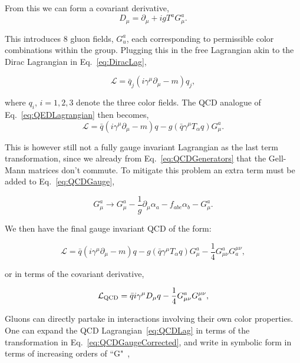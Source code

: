 From this we can form a covariant derivative, 
\begin{equation}
    \label{eq:CovariantDerivativeQCD}
    D_\mu = \partial_\mu + igT^{a}G^{a}_\mu.
\end{equation}

This introduces 8 gluon fields, $G^{a}_{u}$, each corresponding to permissible color combinations within the group. Plugging this in the free Lagrangian akin to the Dirac Lagrangian in Eq.~\ref{eq:DiracLag},

\begin{equation}
    \label{eq:FreeLag}
    \mathcal{L} = \bar{q}_{j}(i\gamma^{\mu} \partial_{\mu} - m)q_j, 
\end{equation}

where $q_i$, $i = 1,2,3$ denote the three color fields. The QCD analogue of Eq.~\ref{eq:QEDLagrangian} then becomes, 
\begin{equation}
    \label{eq:FreeLag}
  \mathcal{L} = \bar{q}(i\gamma^{\mu} \partial_{\mu} - m)q - g(\bar{q}\gamma^{\mu}T_{\alpha}q)G^{a}_{\mu}. 
\end{equation}

This is however still not a fully gauge invariant Lagrangian as the last term transformation, since we already from Eq.~\ref{eq:QCDGenerators} that the Gell-Mann matrices don't commute. To mitigate this problem an extra term must be added to Eq.~\ref{eq:QCDGauge}, 

\begin{equation}
    \label{eq:QCDGaugeCorrected}
    G^{a}_{\mu} \rightarrow G^{a}_{\mu} - \frac{1}{g}\partial_{\mu} \alpha_a -f_{abc}\alpha_{b}-G^{a}_{\mu}.
\end{equation}

We then have the final gauge invariant QCD of the form:

\begin{equation}
    \label{eq:QCDLag}
  \mathcal{L} = \bar{q}(i\gamma^{\mu} \partial_{\mu} - m)q - g(\bar{q}\gamma^{\mu}T_{\alpha}q)G^{a}_{\mu} - \frac{1}{4}G^{a}_{\mu\nu}G^{\mu\nu}_{a},
\end{equation}

or in terms of the covariant derivative, 

\begin{equation}
    \label{eq:QCDLag}
  \mathcal{L}_{\textnormal{QCD}} = \bar{q}i\gamma^{\mu} D_{\mu}q - \frac{1}{4}G^{a}_{\mu\nu}G^{\mu\nu}_{a},
\end{equation}

Gluons can directly partake in interactions involving their own color properties. One can expand the QCD Lagrangian~\ref{eq:QCDLag} in terms of the transformation in Eq.~\ref{eq:QCDGaugeCorrected}, and write in symbolic form in terms of increasing orders of ``G"~\cite{Halzen:1984mc},


